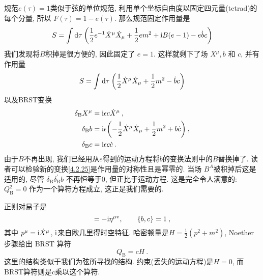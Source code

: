规范$e(\tau)=1$类似于弦的单位规范, 利用单个坐标自由度以固定四元量(tetrad)的每个分量, 所以 $F(\tau)=1-e(\tau)$. 那么规范固定作用量是
\begin{equation}
S=\int \mathrm{d} \tau\: \biggl(\frac{1}{2} e^{-1} \dot{X}^{\mu} \dot{X}_{\mu}+\frac{1}{2} e m^{2}+\mathrm{i} B(e-1)-e \dot{b} c\biggr) \label{4.2.23}
\end{equation}
我们发现将$B$积掉是很方便的, 因此固定了 $e=1 $. 这样就剩下了场 $X^{\mu}, b$ 和 $c$, 并有作用量
\begin{equation}
S=\int \mathrm{d} \tau\:\biggl(\frac{1}{2} \dot{X}^{\mu} \dot{X}_{\mu}+\frac{1}{2} m^{2}-\dot{b} c\biggr)  \label{4.2.24}
\end{equation}
以及BRST变换
\begin{subequations}\label{4.2.25}
\begin{align}
\delta_{\mathrm{B}} X^{\mu}&=\mathrm{i} \epsilon c \dot{X}^{\mu} \:, \label{4.2.25a} \\
\delta_{\mathrm{B}} b&=\mathrm{i} \epsilon\biggl(-\frac{1}{2} \dot{X}^{\mu} \dot{X}_{\mu}+\frac{1}{2} m^{2}+b\dot{c} \biggr) \:, \label{4.2.25b} \\
\delta_{\mathrm{B}} c&=\mathrm{i} \epsilon c \dot{c} \:. \label{4.2.25c}
\end{align}
\end{subequations}
由于$B$不再出现, 我们已经用从$e$得到的运动方程将$b$的变换法则中的$B$替换掉了. 读者可以检验新的变换\eqref{4.2.25}是作用量的对称性且是幂零的. 当场 $B^{A}$被积掉后这是适用的, 尽管 $\delta_{\mathrm{B}} \delta_{\mathrm{B}}^{\prime} b$ 不再恒等于0, 但正比于运动方程. 这是完全令人满意的: $Q_{\mathrm{B}}^{2}=0$ 作为一个算符方程成立, 这正是我们需要的.

正则对易子是
\begin{equation}
[p^{\mu}, X^{v}]=-\mi \eta^{\mu v}, \qquad\{b, c\}=1 \:, \label{4.2.26}
\end{equation}
其中 $p^{\mu}=\mathrm{i} \dot{X}^{\mu}$, $\mathrm{i}$来自欧几里得时空特征. 哈密顿量是$H=\frac{1}{2}\left(p^{2}+m^{2}\right)$,  Noether步骤给出 BRST 算符
\begin{equation}
Q_{\mathrm{B}}=c H \:. \label{4.2.27}
\end{equation}
这里的结构类似于我们为弦所寻找的结构. 约束(丢失的运动方程)是$H=0$, 而BRST算符则是c乘以这个算符.


